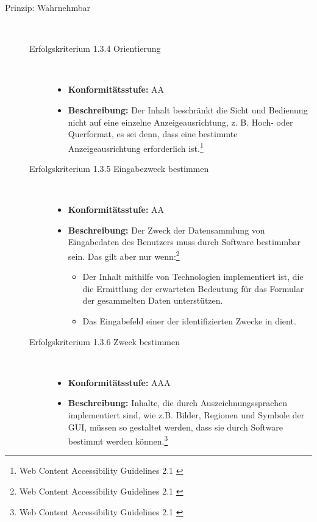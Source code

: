 \begin{description}
	\item[Prinzip: Wahrnehmbar]\hfill \\
	\begin{description}
		\item [Erfolgskriterium 1.3.4 Orientierung]\hfill \\
		\begin{itemize}
			\item \textbf{Konformitätsstufe:} AA
			\item \textbf{Beschreibung:} Der Inhalt beschränkt die Sicht und Bedienung nicht auf eine einzelne Anzeigeausrichtung, z. B. Hoch- oder Querformat, es sei
			 denn, dass eine bestimmte Anzeigeausrichtung erforderlich ist.\footnote{Web Content Accessibility Guidelines 2.1 \cite{WCAG2.1}}
		\end{itemize}
		
		\item [Erfolgskriterium 1.3.5 Eingabezweck bestimmen]\hfill \\
		\begin{itemize}
			\item \textbf{Konformitätsstufe:} AA
			\item \textbf{Beschreibung:} Der Zweck der Datensammlung von Eingabedaten des Benutzers muss durch Software bestimmbar sein. Das gilt aber nur 
			wenn:\footnote{Web Content Accessibility Guidelines 2.1 \cite{WCAG2.1}}
			\begin{itemize}
				\item Der Inhalt mithilfe von Technologien implementiert ist, die die Ermittlung der erwarteten Bedeutung für das Formular der gesammelten Daten unterstützen.
				\item Das Eingabefeld einer der identifizierten Zwecke in  dient.
			\end{itemize}
		\end{itemize}
		
		\item [Erfolgskriterium 1.3.6 Zweck bestimmen]\hfill \\
		\begin{itemize}
			\item \textbf{Konformitätsstufe:} AAA
			\item \textbf{Beschreibung:} Inhalte, die durch Auszeichnungssprachen implementiert sind, wie z.B. Bilder, Regionen und Symbole der \ac{GUI}, müssen 
			so gestaltet werden, dass sie durch Software bestimmt werden können.\footnote{Web Content Accessibility Guidelines 2.1 \cite{WCAG2.1}}
		\end{itemize}
		

\end{description}
\end{description}
